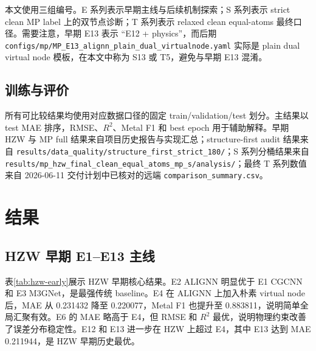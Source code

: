 \documentclass[UTF8,a4paper,11pt]{ctexart}
\newcommand{\rdsq}{R^2}
\begin{document}
本文使用三组编号。E 系列表示早期主线与后续机制探索；S 系列表示 strict clean MP label 上的双节点诊断；T 系列表示 relaxed clean equal-atoms 最终口径。需要注意，早期 E13 表示 ``E12 + physics''，而后期 \texttt{configs/mp/MP\_E13\_alignn\_plain\_dual\_virtualnode.yaml} 实际是 plain dual virtual node 模板，在本文中称为 S13 或 T5，避免与早期 E13 混淆。

\subsection{训练与评价}

所有可比较结果均使用对应数据口径的固定 train/validation/test 划分。主结果以 test MAE 排序，RMSE、$\rdsq$、Metal F1 和 best epoch 用于辅助解释。早期 HZW 与 MP full 结果来自项目历史报告与实现汇总；structure-first audit 结果来自 \texttt{results/data\_quality/structure\_first\_strict\_180/}；S 系列分桶结果来自 \texttt{results/mp\_hzw\_final\_clean\_equal\_atoms\_mp\_s/analysis/}；最终 T 系列数值来自 2026-06-11 交付计划中已核对的远端 \texttt{comparison\_summary.csv}。

\section{结果}

\subsection{HZW 早期 E1--E13 主线}

表\ref{tab:hzw-early}展示 HZW 早期核心结果。E2 ALIGNN 明显优于 E1 CGCNN 和 E3 M3GNet，是最强传统 baseline。E4 在 ALIGNN 上加入朴素 virtual node 后，MAE 从 0.231432 降至 0.220077，Metal F1 也提升至 0.883811，说明简单全局汇聚有效。E6 的 MAE 略高于 E4，但 RMSE 和 $\rdsq$ 最优，说明物理约束改善了误差分布稳定性。E12 和 E13 进一步在 HZW 上超过 E4，其中 E13 达到 MAE 0.211944，是 HZW 早期历史最优。
\end{document}
